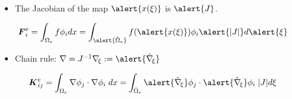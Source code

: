 \begin{frame}[t]
      {
	\begin{block}{}
	\begin{itemize}    
	\item{
	  The Jacobian of the map $\alert{x(\xi)}$ is $\alert{J}$.
	}
	\end{itemize}
	\end{block}
	\begin{equation}
	  \nonumber
	  \bv{F}^e_{i} = \int_{\Omega_e} f \phi_i dx
	  =  \int_{\alert{\hat{\Omega}_e}}
	  f (\alert{x(\xi)}) \phi_i \alert{|J|} d\alert{\xi}
	\end{equation}
      }

{
  \begin{block}{}
  \begin{itemize}    
  \item{
    Chain rule: 
    $\nabla 
    = J^{-1}\nabla_{\!\xi}
    := \alert{\hat{\nabla}_{\!\xi}}$
  }
  \end{itemize}
  \end{block}
  \begin{equation}
    \nonumber
    \bv{K}^e_{ij} =
    \int_{\Omega_e}
    \nabla \phi_j \cdot \nabla \phi_i \;dx =
    \int_{\hat{\Omega}_e}
    \alert{\hat{\nabla}_{\!\xi}} \phi_j \cdot
    \alert{\hat{\nabla}_{\!\xi}} \phi_i \;|J| d\xi
  \end{equation}
}
\end{frame}
